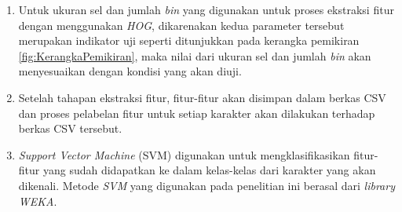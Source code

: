 \begin{enumerate}
	\item Untuk ukuran sel dan jumlah \textit{bin} yang digunakan untuk proses ekstraksi fitur dengan menggunakan \textit{HOG}, dikarenakan kedua parameter tersebut merupakan indikator uji seperti ditunjukkan pada kerangka pemikiran \ref{fig:KerangkaPemikiran}, maka nilai dari ukuran sel dan jumlah \textit{bin} akan menyesuaikan dengan kondisi yang akan diuji.
	\item Setelah tahapan ekstraksi fitur, fitur-fitur akan disimpan dalam berkas CSV dan proses pelabelan fitur untuk setiap karakter akan dilakukan terhadap berkas CSV tersebut.
	\item \textit{Support Vector Machine} (SVM) digunakan untuk mengklasifikasikan fitur-fitur yang sudah didapatkan ke dalam kelas-kelas dari karakter yang akan dikenali. Metode \textit{SVM} yang digunakan pada penelitian ini berasal dari \textit{library WEKA}.
\end{enumerate}
